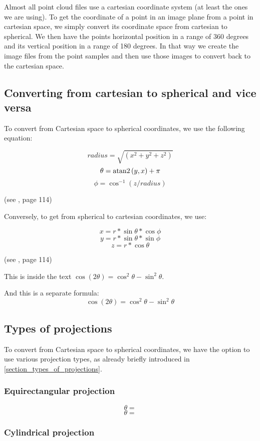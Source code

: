 Almost all point cloud files use a cartesian coordinate system (at least the ones we are using). To get the coordinate of a point in an image plane from a point in cartesian space, we simply convert its coordinate space from cartesian to spherical. We then have the points horizontal position in a range of 360 degrees and its vertical position in a range of 180 degrees. In that way we create the image files from the point samples and then use those images to convert back to the cartesian space.

\subsection{Converting from cartesian to spherical and vice versa}

To convert from Cartesian space to spherical coordinates, we use the following equation:

$$radius = \sqrt{ (x^2 + y^2 + z^2) } $$
$$\theta = {\rm atan2} \left(y , x\right) + \pi$$
$$\phi = \cos^{-1} (z / radius)$$

(see \parencite{Pharr:2010:PBR:1854996}, page 114)


Conversely, to get from spherical to cartesian coordinates, we use:

$$x = r * \sin \theta * \cos \phi$$
$$y = r * \sin \theta * \sin \phi$$
$$z = r * \cos \theta$$

(see \parencite{Pharr:2010:PBR:1854996}, page 114)

This is inside the text $\cos (2\theta) = \cos^2 \theta - \sin^2 \theta$.


And this is a separate formula:
$$\cos (2\theta) = \cos^2 \theta - \sin^2 \theta$$

\subsection{Types of projections}

To convert from Cartesian space to spherical coordinates, we have the option to use various projection types, as already briefly introduced in \ref{section_types_of_projections}.

\subsubsection{Equirectangular projection}

$$\theta = $$
$$\theta = $$

\subsubsection{Cylindrical projection}

